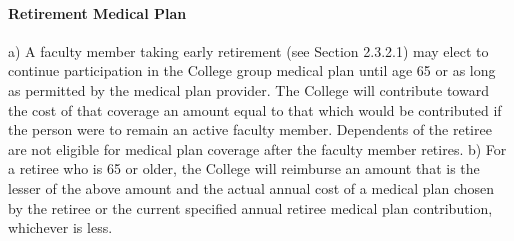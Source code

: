 \documentclass[letterpaper, 11pt]{article}
\begin{document}
			\paragraph{Retirement Medical Plan}
				a) A faculty member taking early retirement (see Section 2.3.2.1) may elect to continue participation in the College group medical plan until age 65 or as long as permitted by the medical plan provider.  The College will contribute toward the cost of that coverage an amount equal to that which would be contributed if the person were to remain an active faculty member.  Dependents of the retiree are not eligible for medical plan coverage after the faculty member retires.
				b) For a retiree who is 65 or older, the College will reimburse an amount that is the lesser of the above amount and the actual annual cost of a medical plan chosen by the retiree or the current specified annual retiree medical plan contribution, whichever is less.
\end{document}
